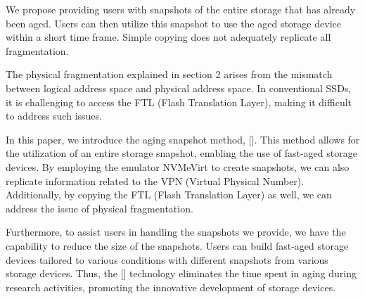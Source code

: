 We propose providing users with snapshots of the entire storage that has already been aged.
Users can then utilize this snapshot to use the aged storage device within a short time frame.
Simple copying does not adequately replicate all fragmentation.

The physical fragmentation explained in section 2 arises from the mismatch between logical address space and physical address space.
In conventional SSDs, it is challenging to access the FTL (Flash Translation Layer), making it difficult to address such issues.

In this paper, we introduce the aging snapshot method, [].
This method allows for the utilization of an entire storage snapshot, enabling the use of fast-aged storage devices.
By employing the emulator NVMeVirt to create snapshots, we can also replicate information related to the VPN (Virtual Physical Number).
Additionally, by copying the FTL (Flash Translation Layer) as well, we can address the issue of physical fragmentation.

Furthermore, to assist users in handling the snapshots we provide, we have the capability to reduce the size of the snapshots.
Users can build fast-aged storage devices tailored to various conditions with different snapshots from various storage devices.
Thus, the [] technology eliminates the time spent in aging during research activities, promoting the innovative development of storage devices.

